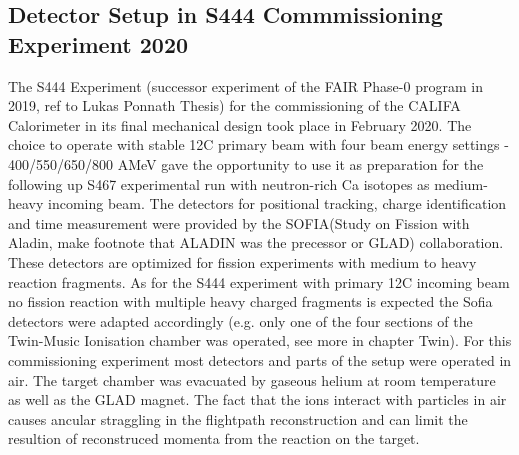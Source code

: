 \subsection{Detector Setup in S444 Commmissioning Experiment 2020}
The S444 Experiment (successor experiment of the FAIR Phase-0 program in 2019, ref to Lukas Ponnath Thesis) for the commissioning of the CALIFA Calorimeter in its final mechanical design took place in February 2020. The choice to operate with stable 12C primary beam with four beam energy settings - 400/550/650/800 AMeV  gave the opportunity to use it as preparation for the following up S467 experimental run with neutron-rich Ca isotopes as medium-heavy incoming beam. The detectors for positional tracking, charge identification and time measurement were provided by the SOFIA(Study on Fission with Aladin, make footnote that ALADIN was the precessor or GLAD) collaboration. These detectors are optimized for fission experiments with medium to heavy reaction fragments. As for the S444 experiment with primary 12C incoming beam no fission reaction with multiple heavy charged fragments is expected the Sofia detectors were adapted accordingly (e.g. only one of the four sections of the Twin-Music Ionisation chamber was operated, see more in chapter Twin).\newline
For this commissioning experiment most detectors and parts of the setup were operated in air. The target chamber was evacuated by gaseous helium at room temperature as well as the GLAD magnet. The fact that the ions interact with particles in air causes ancular straggling in the flightpath reconstruction and can limit the resultion of reconstruced momenta from the reaction on the target\cite{AbedonHymanThomas2003}.\newline  

